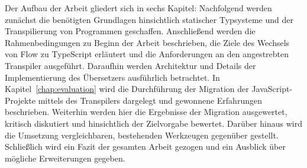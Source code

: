 Der Aufbau der Arbeit gliedert sich in sechs Kapitel: Nachfolgend werden zunächst die benötigten Grundlagen hinsichtlich statischer Typsysteme und der Transpilierung von Programmen geschaffen. Anschließend werden die Rahmenbedingungen zu Beginn der Arbeit beschrieben, die Ziele des Wechsels von Flow zu TypeScript erläutert und die Anforderungen an den angestrebten Transpiler ausgeführt. Daraufhin werden Architektur und Details der Implementierung des Übersetzers ausführlich betrachtet. In Kapitel~\ref{chap:evaluation} wird die Durchführung der Migration der JavaScript-Projekte mittels des Transpilers dargelegt und gewonnene Erfahrungen beschrieben. Weiterhin werden hier die Ergebnisse der Migration ausgewertet, kritisch diskutiert und hinsichtlich der Zielvorgabe bewertet. Darüber hinaus wird die Umsetzung vergleichbaren, bestehenden Werkzeugen gegenüber gestellt. Schließlich wird ein Fazit der gesamten Arbeit gezogen und ein Ausblick über mögliche Erweiterungen gegeben.
